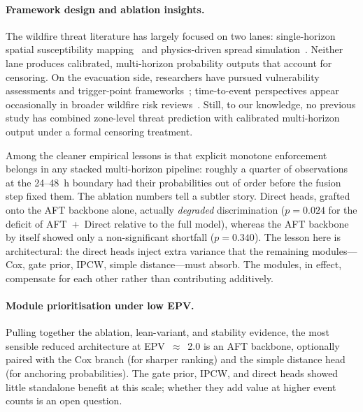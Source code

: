 \documentclass[fire,article,submit,pdftex]{../Definitions/mdpi}
\begin{document}
\paragraph{Framework design and ablation insights.}
The wildfire threat literature has largely focused on two lanes: single-horizon spatial susceptibility mapping~\cite{Jaafari2019,Gigovic2019,Chen2024wui,Kaur2022} and physics-driven spread simulation~\cite{Finney2001,Cruz2003,Shu2020,Pais2021,Zheng2021}. Neither lane produces calibrated, multi-horizon probability outputs that account for censoring.
On the evacuation side, researchers have pursued vulnerability assessments and trigger-point frameworks~\cite{Dolan2022,Paveglio2019,Alcasena2019}; time-to-event perspectives appear occasionally in broader wildfire risk reviews~\cite{Xi2019,Taylor2013}. Still, to our knowledge, no previous study has combined zone-level threat prediction with calibrated multi-horizon output under a formal censoring treatment.

Among the cleaner empirical lessons is that explicit monotone enforcement belongs in any stacked multi-horizon pipeline: roughly a quarter of observations at the 24--48~h boundary had their probabilities out of order before the fusion step fixed them.
The ablation numbers tell a subtler story. Direct heads, grafted onto the AFT backbone alone, actually \emph{degraded} discrimination ($p = 0.024$ for the deficit of AFT~+~Direct relative to the full model), whereas the AFT backbone by itself showed only a non-significant shortfall ($p = 0.340$). The lesson here is architectural: the direct heads inject extra variance that the remaining modules---Cox, gate prior, IPCW, simple distance---must absorb. The modules, in effect, compensate for each other rather than contributing additively.

\paragraph{Module prioritisation under low EPV.}
Pulling together the ablation, lean-variant, and stability evidence, the most sensible reduced architecture at EPV~$\approx$~2.0 is an AFT backbone, optionally paired with the Cox branch (for sharper ranking) and the simple distance head (for anchoring probabilities).
The gate prior, IPCW, and direct heads showed little standalone benefit at this scale; whether they add value at higher event counts is an open question.
\end{document}
